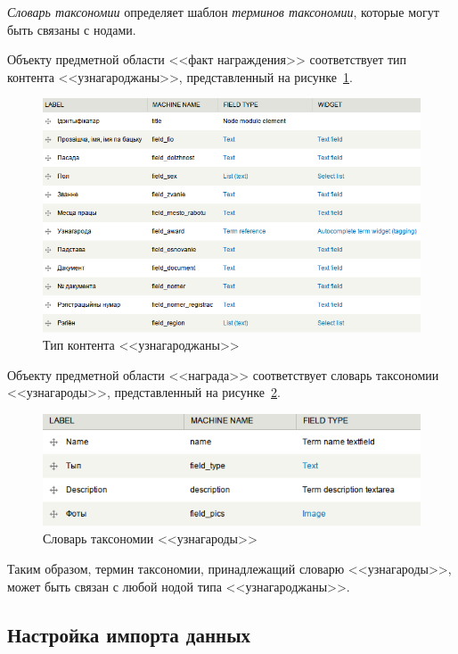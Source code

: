 \textit{Словарь таксономии} определяет шаблон \textit{терминов таксономии}, которые
могут быть связаны с нодами.

Объекту предметной области <<факт награждения>> соответствует тип контента <<узнагароджаны>>,
представленный на рисунке~\ref{fig:awarded_content_type}.

\begin{figure}[h]
  \centering
  \includegraphics[width=160mm]{pic/awarded_content_type.png}
  \caption{Тип контента <<узнагароджаны>>}
  \label{fig:awarded_content_type}
\end{figure}

Объекту предметной области <<награда>> соответствует словарь таксономии <<узнагароды>>,
представленный на рисунке~\ref{fig:awards_taxonomy}.

\begin{figure}[h]
  \centering
  \includegraphics[width=160mm]{pic/awards_taxonomy.png}
  \caption{Словарь таксономии <<узнагароды>>}
  \label{fig:awards_taxonomy}
\end{figure}

Таким образом, термин таксономии, принадлежащий словарю <<узнагароды>>, может
быть связан с любой нодой типа <<узнагароджаны>>.

\subsection{Настройка импорта данных}
\label{ssec:import_setup}

